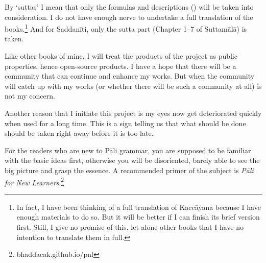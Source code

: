 By `suttas' I mean that only the formulas and descriptions () will be taken into consideration. I do not have enough nerve to undertake a full translation of the books.\footnote{In fact, I have been thinking of a full translation of Kaccāyana because I have enough materials to do so. But it will be better if I can finish its brief version first. Still, I give no promise of this, let alone other books that I have no intention to translate them in full.} And for Saddanīti, only the sutta part (Chapter 1--7 of Suttamālā) is taken.

Like other books of mine, I will treat the products of the project as public properties, hence open-source products. I have a hope that there will be a community that can continue and enhance my works. But when the community will catch up with my works (or whether there will be such a community at all) is not my concern.

Another reason that I initiate this project is my eyes now get deteriorated quickly when used for a long time. This is a sign telling us that what should be done should be taken right away before it is too late.

For the readers who are new to Pāli grammar, you are supposed to be familiar with the basic ideas first, otherwise you will be disoriented, barely able to see the big picture and grasp the essence. A recommended primer of the subject is \emph{Pāli for New Learners}.\footnote{bhaddacak.github.io/pnl}
